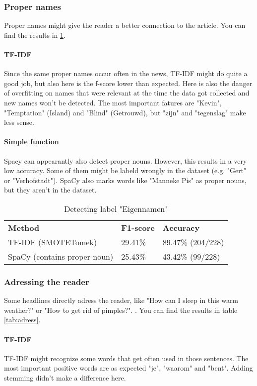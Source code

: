 \documentclass{article}
\begin{document}
\subsubsection{Proper names}
Proper names might give the reader a better connection to the article. \cite{soubry} You can find the results in \ref{tab:proper}.

\paragraph{TF-IDF} Since the same proper names occur often in the news, TF-IDF might do quite a good job, but also here is the f-score lower than expected. Here is also the danger of overfitting  on names that were relevant at the time the data got collected and new names won't be detected. The most important fatures are "Kevin", "Temptation" (Island) and "Blind" (Getrouwd), but "zijn" and "tegenslag" make less sense.

\paragraph{Simple function} Spacy can appearantly also detect proper nouns. However, this results in a very low accuracy. Some of them might be labeld wrongly in the dataset (e.g. "Gert" or "Verhofstadt"). SpaCy also marks words like "Manneke Pis" as proper nouns, but they aren't in the dataset.

\begin{table}[]
\begin{tabular}{lll}
\textbf{Method}            & \textbf{F1-score} & \textbf{Accuracy} \\
TF-IDF (SMOTETomek)        & 29.41\%           & 89.47\% (204/228) \\
SpaCy (contains proper noun) & 25.43\%           & 43.42\% (99/228)
\end{tabular}\caption{Detecting label "Eigennamen"}
\label{tab:proper}
\end{table}

\subsubsection{Adressing the reader}
Some headlines directly adress the reader, like "How can I sleep in this warm weather?" or "How to get rid of pimples?". \cite{soubry}. You can find the results in table \ref{tab:adress}.

\paragraph{TF-IDF} TF-IDF might recognize some words that get often used in those sentences. The most important positive words are as expected "je", "waarom" and "bent". Adding stemming didn't make a difference here.
\end{document}

